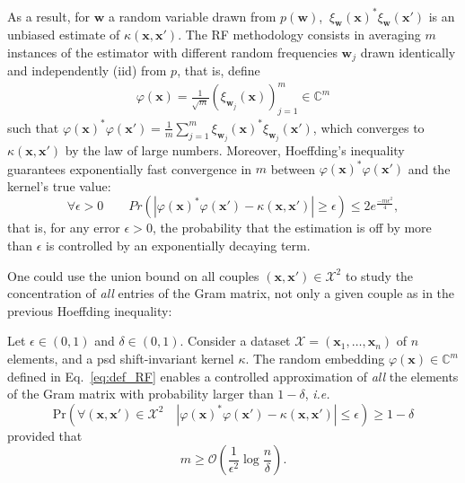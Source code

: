 As a result, for $\mathbf{w}$ a random variable drawn from $p(\mathbf{w})$, $\  \xi_\mathbf{w}(\mathbf{x})^*  \xi_\mathbf{w}(\mathbf{x}')$ is an unbiased estimate of $\kappa(\mathbf{x},\mathbf{x}')$. The RF methodology consists in averaging $m$ instances of the estimator with different random frequencies $\mathbf{w}_j$ drawn identically and independently (iid) from $p$, that is, define
\begin{align}
	\label{eq:def_RF}
	\varphi(\mathbf{x}) = \frac{1}{\sqrt{m}} ( \xi_{\mathbf{w}_j}(\mathbf{x}) )_{j=1}^m \in \mathbb{C}^m
\end{align}
such that $\varphi(\mathbf{x})^*\varphi(\mathbf{x}')=\frac{1}{m} \sum_{j=1}^m \xi_{\mathbf{w}_j}(\mathbf{x})^*\xi_{\mathbf{w}_j}(\mathbf{x}')$, which converges to $\kappa(\mathbf{x},\mathbf{x}')$ by the law of large numbers. Moreover, Hoeffding's inequality guarantees exponentially fast convergence in $m$ between $\varphi(\mathbf{x})^*\varphi(\mathbf{x}')$ and the kernel's true value:
\begin{equation}
\forall \epsilon >0\qquad Pr(|\varphi(\mathbf{x})^*\varphi(\mathbf{x}')-\kappa(\mathbf{x},\mathbf{x}')|\geq\epsilon)\leq2e^\frac{-m\epsilon^2}{4},
\end{equation}
that is, for any error $\epsilon>0$, the probability that the estimation is off by more than $\epsilon$ is controlled by an exponentially decaying term.

One could use the union bound on all couples $(\mathbf{x},\mathbf{x}')\in\mathcal{X}^2$ to study the  concentration of \emph{all} entries of the Gram matrix, not only a given couple as in the previous Hoeffding inequality:
\begin{theorem}[]\label{thm:RF_vs_logn}
	Let $\epsilon\in(0,1)$ and $\delta\in(0,1)$. Consider a dataset $\mathcal{X}=(\mathbf{x}_1,\ldots,\mathbf{x}_n)$ of $n$ elements, and a psd shift-invariant kernel $\kappa$. The random embedding  $\varphi(\mathbf{x})\in\mathbb{C}^m$ defined in Eq.~\eqref{eq:def_RF} enables a controlled approximation of \emph{all} the elements of the Gram matrix with probability larger than $1-\delta$, \emph{i.e.}
	$$\text{Pr}\left(\forall (\mathbf{x}, \mathbf{x}')\in\mathcal{X}^2\quad|\varphi(\mathbf{x})^*\varphi(\mathbf{x}')-\kappa(\mathbf{x},\mathbf{x}')|\leq\epsilon\right)\geq 1-\delta$$ 
	provided that 
	$$m\geq\mathcal{O}\left(\frac{1}{\epsilon^2}\log{\frac{n}{\delta}}\right).$$
\end{theorem}

